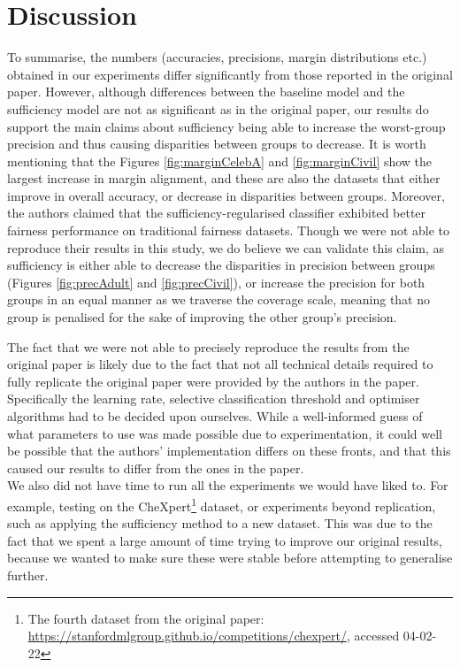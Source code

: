 \section{Discussion}
To summarise, the numbers (accuracies, precisions, margin distributions etc.) obtained in our experiments differ significantly from those reported in the original paper. However, although differences between the baseline model and the sufficiency model are not as significant as in the original paper, our results do support the main claims about sufficiency being able to increase the worst-group precision and thus causing disparities between groups to decrease. It is worth mentioning that the Figures \ref{fig:marginCelebA} and \ref{fig:marginCivil} show the largest increase in margin alignment, and these are also the datasets that either improve in overall accuracy, or decrease in disparities between groups. Moreover, the authors claimed that the sufficiency-regularised classifier exhibited better fairness performance on traditional fairness datasets. Though we were not able to reproduce their results in this study, we do believe we can validate this claim, as sufficiency is either able to decrease the disparities in precision between groups (Figures \ref{fig:precAdult} and \ref{fig:precCivil}), or increase the precision for both groups in an equal manner as we traverse the coverage scale, meaning that no group is penalised for the sake of improving the other group's precision.

The fact that we were not able to precisely reproduce the results from the original paper is likely due to the fact that not all technical details required to fully replicate the original paper were provided by the authors in the paper. Specifically the learning rate, selective classification threshold and optimiser algorithms had to be decided upon ourselves. While a well-informed guess of what parameters to use was made possible due to experimentation, it could well be possible that the authors' implementation differs on these fronts, and that this caused our results to differ from the ones in the paper. \\ 
We also did not have time to run all the experiments we would have liked to. For example, testing on the CheXpert\footnote{The fourth dataset from the original paper: \url{https://stanfordmlgroup.github.io/competitions/chexpert/}, accessed 04-02-22} dataset, or experiments beyond replication, such as applying the sufficiency method to a new dataset. This was due to the fact that we spent a large amount of time trying to improve our original results, because we wanted to make sure these were stable before attempting to generalise further.

